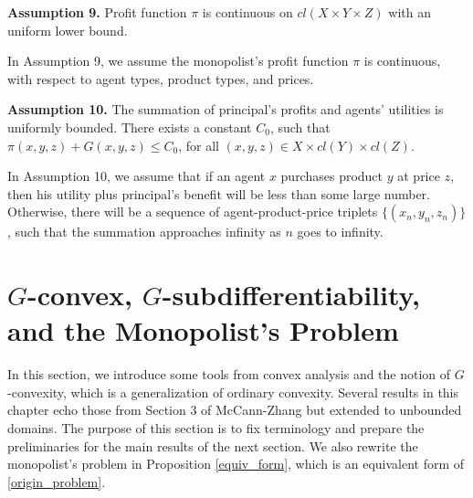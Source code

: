 \documentclass[a4paper, 11pt]{amsart}
\numberwithin{equation}{section}
\theoremstyle{plain}
\theoremstyle{definition}
\theoremstyle{remark}
\begin{document}
{\bf Assumption 9.} Profit function $\pi$ is continuous on $cl(X\times Y\times Z)$ with an uniform lower bound.\medskip

In Assumption 9, we assume the monopolist's profit function $\pi$ is 
	continuous, with respect to agent types, product types, and prices. \medskip

{\bf Assumption 10.} The summation of principal's profits and agents' utilities is uniformly bounded. %
There exists a constant $C_0$, such that $\pi(x, y,z) + G(x,y,z) \le C_0$, for all $(x, y, z) \in X \times  cl(Y) \times cl(Z)$. \medskip

In Assumption 10, we assume that if an agent $x$ purchases product $y$ at price $z$, then his utility plus principal's benefit will be less than some large number. Otherwise, there will be a sequence of agent-product-price triplets $\{ (x_n, y_n, z_n)\}$, such that the summation approaches infinity as $n$ goes to infinity.



 

 







\bigskip



\section{$G$-convex, $G$-subdifferentiability, and the Monopolist's Problem}\label{section:preliminary}

In this section, we introduce some tools from convex analysis and the notion of $G$-convexity, which is a generalization of ordinary convexity. {Several results in this chapter echo those from Section 3 of McCann-Zhang \cite{McCannZhang17} but extended to unbounded domains.} {
	The purpose of this section is to fix terminology and prepare the preliminaries for the main results of the next section.} We also rewrite the monopolist's problem in Proposition \ref{equiv_form}, which is an equivalent form of \eqref{origin_problem}. \medskip
\end{document}
